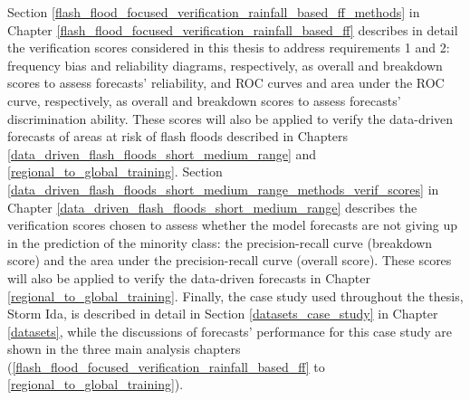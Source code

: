 Section \ref{flash_flood_focused_verification_rainfall_based_ff_methods} in Chapter \ref{flash_flood_focused_verification_rainfall_based_ff} describes in detail the verification scores considered in this thesis to address requirements 1 and 2: frequency bias and reliability diagrams, respectively, as overall and breakdown scores to assess forecasts' reliability, and ROC curves and area under the ROC curve, respectively, as overall and breakdown scores to assess forecasts' discrimination ability. These scores will also be applied to verify the data-driven forecasts of areas at risk of flash floods described in Chapters \ref{data_driven_flash_floods_short_medium_range} and \ref{regional_to_global_training}. Section \ref{data_driven_flash_floods_short_medium_range_methods_verif_scores} in Chapter \ref{data_driven_flash_floods_short_medium_range} describes the verification scores chosen to assess whether the model forecasts are not giving up in the prediction of the minority class: the precision-recall curve (breakdown score) and the area under the precision-recall curve (overall score). These scores will also be applied to verify the data-driven forecasts in Chapter \ref{regional_to_global_training}. Finally, the case study used throughout the thesis, Storm Ida, is described in detail in Section \ref{datasets_case_study} in Chapter \ref{datasets}, while the discussions of forecasts' performance for this case study are shown in the three main analysis chapters  (\ref{flash_flood_focused_verification_rainfall_based_ff} to \ref{regional_to_global_training}).